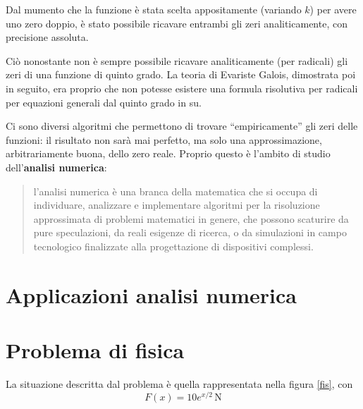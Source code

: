 \documentclass[a4paper, oneside, titlepage, reqno]{book}
\begin{document}
Dal mumento che la funzione è stata scelta appositamente (variando $k$) per avere uno zero doppio, è stato possibile ricavare entrambi gli zeri analiticamente, con precisione assoluta. 

Ciò nonostante non è sempre possibile ricavare analiticamente (per radicali) gli zeri di una funzione di quinto grado.
La teoria di Evariste Galois, dimostrata poi in seguito, era proprio che non potesse esistere una formula risolutiva per radicali per equazioni generali dal quinto grado in su\supercite{eq:ter}.

Ci sono diversi algoritmi che permettono di trovare ``empiricamente'' gli zeri delle funzioni: il risultato non sarà mai perfetto, ma solo una approssimazione, arbitrariamente buona, dello zero reale.
Proprio questo è l'ambito di studio dell'\textbf{analisi numerica}: 
\begin{quotation}
\noindent l'analisi numerica è una branca della matematica che si occupa di individuare, analizzare e implementare algoritmi per la risoluzione approssimata di problemi matematici in genere, che possono scaturire da pure speculazioni, da reali esigenze di ricerca, o da simulazioni in campo tecnologico finalizzate alla progettazione di dispositivi complessi\supercite{trec:an}.
\end{quotation}

\chapter{Applicazioni analisi numerica}

\chapter{Problema di fisica}

La situazione descritta dal problema è quella rappresentata nella figura \ref{fis}, con
\[F(x)=10e^{x/2}\,\text{N}\]

\begin{figure}
\end{figure}
\end{document}
